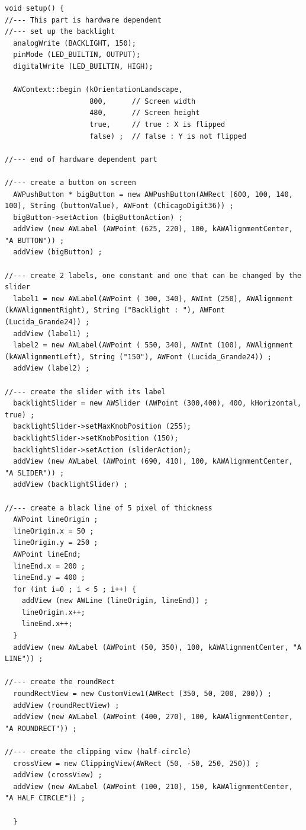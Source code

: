 \documentclass[a4paper,11pt]{extarticle}
\begin{document}
\begin{lstlisting}[language=Arduinonl]
void setup() {
//--- This part is hardware dependent
//--- set up the backlight
  analogWrite (BACKLIGHT, 150);
  pinMode (LED_BUILTIN, OUTPUT);
  digitalWrite (LED_BUILTIN, HIGH);

  AWContext::begin (kOrientationLandscape,
                    800,      // Screen width
                    480,      // Screen height
                    true,     // true : X is flipped
                    false) ;  // false : Y is not flipped

//--- end of hardware dependent part

//--- create a button on screen
  AWPushButton * bigButton = new AWPushButton(AWRect (600, 100, 140, 100), String (buttonValue), AWFont (ChicagoDigit36)) ;
  bigButton->setAction (bigButtonAction) ; 
  addView (new AWLabel (AWPoint (625, 220), 100, kAWAlignmentCenter, "A BUTTON")) ;
  addView (bigButton) ; 

//--- create 2 labels, one constant and one that can be changed by the slider 
  label1 = new AWLabel(AWPoint ( 300, 340), AWInt (250), AWAlignment (kAWAlignmentRight), String ("Backlight : "), AWFont (Lucida_Grande24)) ;
  addView (label1) ;
  label2 = new AWLabel(AWPoint ( 550, 340), AWInt (100), AWAlignment (kAWAlignmentLeft), String ("150"), AWFont (Lucida_Grande24)) ;
  addView (label2) ;

//--- create the slider with its label
  backlightSlider = new AWSlider (AWPoint (300,400), 400, kHorizontal, true) ;
  backlightSlider->setMaxKnobPosition (255);
  backlightSlider->setKnobPosition (150);
  backlightSlider->setAction (sliderAction);
  addView (new AWLabel (AWPoint (690, 410), 100, kAWAlignmentCenter, "A SLIDER")) ;
  addView (backlightSlider) ;

//--- create a black line of 5 pixel of thickness
  AWPoint lineOrigin ;
  lineOrigin.x = 50 ;
  lineOrigin.y = 250 ;
  AWPoint lineEnd;
  lineEnd.x = 200 ;
  lineEnd.y = 400 ;
  for (int i=0 ; i < 5 ; i++) {
    addView (new AWLine (lineOrigin, lineEnd)) ;
    lineOrigin.x++;
    lineEnd.x++;
  }
  addView (new AWLabel (AWPoint (50, 350), 100, kAWAlignmentCenter, "A LINE")) ;

//--- create the roundRect
  roundRectView = new CustomView1(AWRect (350, 50, 200, 200)) ;
  addView (roundRectView) ;   
  addView (new AWLabel (AWPoint (400, 270), 100, kAWAlignmentCenter, "A ROUNDRECT")) ;

//--- create the clipping view (half-circle)
  crossView = new ClippingView(AWRect (50, -50, 250, 250)) ;
  addView (crossView) ;
  addView (new AWLabel (AWPoint (100, 210), 150, kAWAlignmentCenter, "A HALF CIRCLE")) ;
  
  }
  \end{lstlisting}
\end{document}
